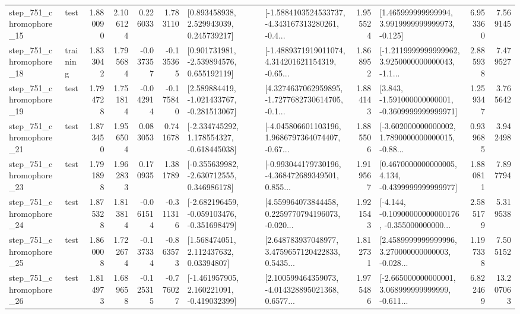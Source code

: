 \begin{tabular}{llrrrrllrlrr}
  step\_751\_chromophore\_15 &      test &      1.880090 &    2.106124 &      0.226033 &  1.783110 &     [0.893458938, 2.529943039, 0.245739217] &  [-1.5884103524533737, -4.343167313280261, -0.4... &       1.955524 &    [1.465999999999994, 3.9919999999999973, -0.125] &            6.953360 &          7.569145 \\
  step\_751\_chromophore\_18 &  training &      1.833042 &    1.795684 &     -0.037357 & -0.135365 &    [0.901731981, -2.539894576, 0.655192119] &  [-1.4889371919011074, 4.314201621154319, -0.65... &       1.868952 &  [-1.2119999999999962, 3.9250000000000043, -1.1... &            2.885938 &          7.479527 \\
  step\_751\_chromophore\_19 &      test &      1.794728 &    1.751814 &     -0.042914 & -0.175840 &   [2.589884419, -1.021433767, -0.281513067] &  [4.3274637062959895, -1.7277682730614705, -0.1... &       1.884143 &   [3.843, -1.591000000000001, -0.3609999999999971] &            1.259347 &          3.765642 \\
  step\_751\_chromophore\_21 &      test &      1.873450 &    1.956504 &      0.083053 &  0.741678 &   [-2.334745292, 1.178554327, -0.618445038] &  [-4.045806601103196, 1.9686797364074407, -0.67... &       1.885506 &  [-3.602000000000002, 1.7890000000000015, -0.88... &            0.939685 &          3.942498 \\
  step\_751\_chromophore\_23 &      test &      1.791898 &    1.962833 &      0.170935 &  1.381789 &   [-0.355639982, -2.630712555, 0.346986178] &  [-0.993044179730196, -4.368472689349501, 0.855... &       1.919567 &   [0.4670000000000005, 4.134, -0.4399999999999977] &            1.880811 &          7.897794 \\
  step\_751\_chromophore\_24 &      test &      1.875328 &    1.813814 &     -0.061514 & -0.311316 &  [-2.682196459, -0.059103476, -0.351698479] &  [4.559964073844458, 0.2259770794196073, -0.020... &       1.921543 &  [-4.144, -0.10900000000000176, -0.355000000000... &            2.585179 &          5.319538 \\
  step\_751\_chromophore\_25 &      test &      1.860008 &    1.722674 &     -0.137334 & -0.863573 &      [1.568474051, 2.112437632, 0.03394807] &  [2.648783937048977, 3.4759657120422833, 0.5435... &       1.812731 &  [2.4589999999999996, 3.270000000000003, -0.028... &            1.197338 &          7.505152 \\
  step\_751\_chromophore\_26 &      test &      1.814973 &    1.689658 &     -0.125315 & -0.776027 &   [-1.461957905, 2.160221091, -0.419032399] &  [2.100599464359073, -4.014328895021368, 0.6577... &       1.975486 &  [-2.665000000000001, 3.068999999999999, -0.611... &            6.822469 &         13.207063 \\

\end{tabular}
